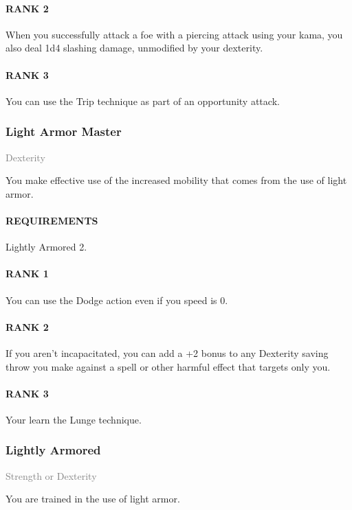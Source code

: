 \paragraph{RANK 2} When you successfully attack a foe with a piercing attack using your kama, you also deal 1d4 slashing damage, unmodified by your dexterity.
\paragraph{RANK 3} You can use the Trip technique as part of an opportunity attack.

\subsubsection{Light Armor Master} \label{feat::lightarmormaster}
\small{\textcolor{gray}{Dexterity}}

\normalsize
You make effective use of the increased mobility that comes from the use of light armor.
\paragraph{REQUIREMENTS} Lightly Armored 2.
\paragraph{RANK 1} You can use the Dodge action even if you speed is 0.
\paragraph{RANK 2} If you aren't incapacitated, you can add a +2 bonus to any Dexterity saving throw you make against a spell or other harmful effect that targets only you.
\paragraph{RANK 3} Your learn the Lunge technique.

\subsubsection{Lightly Armored} \label{feat::lightlyarmored}
\small{\textcolor{gray}{Strength or Dexterity}}

\normalsize
You are trained in the use of light armor.
